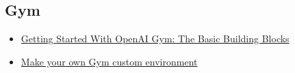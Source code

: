 \documentclass[11pt,a4paper]{article}
\begin{document}
\subsection{Gym}\label{gym}

\begin{itemize}
\tightlist
\item
  \href{https://blog.paperspace.com/getting-started-with-openai-gym/}{Getting Started With OpenAI Gym: The Basic Building Blocks}
\item
  \href{https://www.gymlibrary.dev/content/environment_creation/}{Make your own Gym custom environment}
\end{itemize}
\end{document}

